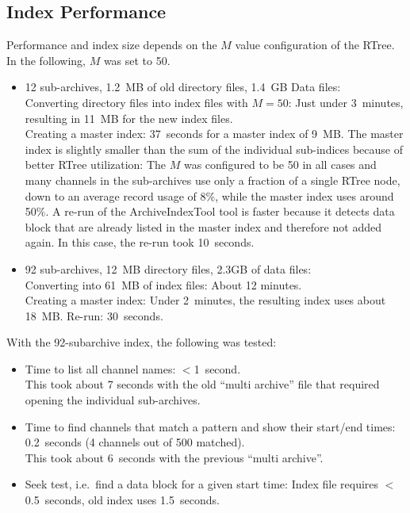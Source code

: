 \subsection{Index Performance}
Performance and index size depends on the $M$ value configuration of
the RTree. In the following, $M$ was set to 50.
\begin{itemize}
\item 12 sub-archives, 1.2~MB of old directory files, 1.4~GB Data
      files:\\
      Converting directory files into index files with $M=50$:
      Just under 3~minutes, resulting in 11~MB for the new index files.\\
      Creating a master index: 37~seconds for a master index of 9~MB.
      The master index is slightly smaller than the sum of the
      individual sub-indices because of better RTree utilization:
      The $M$ was configured to be 50 in all cases and many channels
      in the sub-archives use only a fraction of a single RTree
      node, down to an average record usage of 8\%, while the master
      index uses around 50\%.
      A re-run of the ArchiveIndexTool tool is faster because
      it detects data block that are already listed in the master index and
      therefore not added again. In this case, the re-run took 10~seconds.
\item 92 sub-archives, 12~MB directory files, 2.3GB of data files:\\
      Converting into 61~MB of index files: About 12 minutes.\\
      Creating a master index: Under 2~minutes, the resulting
      index uses about 18~MB.
      Re-run: 30~seconds.
\end{itemize}

\noindent With the 92-subarchive index, the following was tested:
\begin{itemize}
\item Time to list all channel names: $<$1~second.\\
      This took about 7 seconds with the old ``multi archive'' file
      that required opening the individual sub-archives.
\item Time to find channels that match a pattern and show their
      start/end times: 0.2~seconds (4 channels out of 500 matched).\\
      This took about 6~seconds with the previous ``multi archive''.
\item Seek test, i.e.\ find a data block for a given start time:
      Index file requires $<$0.5~seconds, old index uses 1.5~seconds.
\end{itemize}

